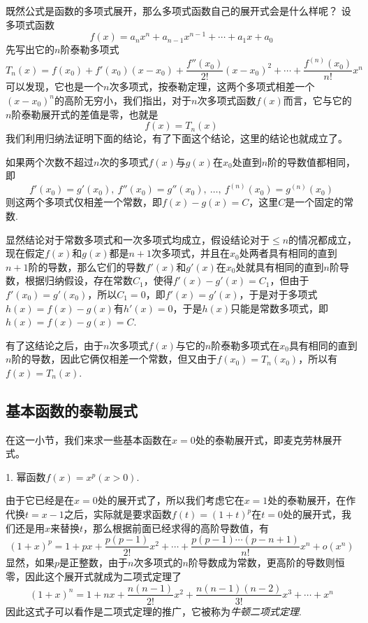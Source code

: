 \begin{example}
  既然公式是函数的多项式展开，那么多项式函数自己的展开式会是什么样呢？ 设多项式函数
  \[ f(x) = a_nx^n+a_{n-1}x^{n-1}+\cdots+a_1x+a_0 \]
  先写出它的$n$阶泰勒多项式
\[ T_n(x) = f(x_0) + f'(x_0)(x-x_0)+\frac{f''(x_0)}{2!}(x-x_0)^2+ \cdots +\frac{f^{(n)}(x_0)}{n!}x^n \]
可以发现，它也是一个$n$次多项式，按泰勒定理，这两个多项式相差一个$(x-x_0)^n$的高阶无穷小，我们指出，对于$n$次多项式函数$f(x)$而言，它与它的$n$阶泰勒展开式的差值是零，也就是
\[ f(x) = T_n(x) \]
我们利用归纳法证明下面的结论，有了下面这个结论，这里的结论也就成立了。

\begin{statement}
  如果两个次数不超过$n$次的多项式$f(x)$与$g(x)$在$x_0$处直到$n$阶的导数值都相同，即
  \[ f'(x_0) = g'(x_0), \  f''(x_0) = g''(x_0), \  \ldots, \  f^{(n)}(x_0) = g^{(n)}(x_0) \]
  则这两个多项式仅相差一个常数，即$f(x)-g(x)=C$，这里$C$是一个固定的常数.
\end{statement}

显然结论对于常数多项式和一次多项式均成立，假设结论对于$\leqslant n$的情况都成立，现在假定$f(x)$和$g(x)$都是$n+1$次多项式，并且在$x_0$处两者具有相同的直到$n+1$阶的导数，那么它们的导数$f'(x)$和$g'(x)$在$x_0$处就具有相同的直到$n$阶导数，根据归纳假设，存在常数$C_1$，使得$f'(x)-g'(x)=C_1$，但由于$f'(x_0)=g'(x_0)$，所以$C_1=0$，即$f'(x)=g'(x)$，于是对于多项式$h(x)=f(x)-g(x)$有$h'(x)=0$，于是$h(x)$只能是常数多项式，即$h(x)=f(x)-g(x)=C$.
\end{example}

有了这结论之后，由于$n$次多项式$f(x)$与它的$n$阶泰勒多项式在$x_0$具有相同的直到$n$阶的导数，因此它俩仅相差一个常数，但又由于$f(x_0)=T_n(x_0)$，所以有$f(x)=T_n(x)$.

\subsection{基本函数的泰勒展式}
\label{sec:taylor-expand-for-fundation-function}

在这一小节，我们来求一些基本函数在$x=0$处的泰勒展开式，即麦克劳林展开式。

1. 幂函数$f(x)=x^p(x>0)$.

由于它已经是在$x=0$处的展开式了，所以我们考虑它在$x=1$处的泰勒展开，在作代换$t=x-1$之后，实际就是要求函数$f(t)=(1+t)^p$在$t=0$处的展开式，我们还是用$x$来替换$t$，那么根据前面已经求得的高阶导数值，有
\[ (1+x)^p = 1 + px + \frac{p(p-1)}{2!}x^2 + \cdots + \frac{p(p-1)\cdots (p-n+1)}{n!}x^n + o(x^n) \]
显然，如果$p$是正整数，由于$n$次多项式的$n$阶导数成为常数，更高阶的导数则恒零，因此这个展开式就成为二项式定理了
\[ (1+x)^n = 1+nx + \frac{n(n-1)}{2!}x^2 + \frac{n(n-1)(n-2)}{3!}x^3 + \cdots + x^n \]
因此这式子可以看作是二项式定理的推广，它被称为\emph{牛顿二项式定理}.

